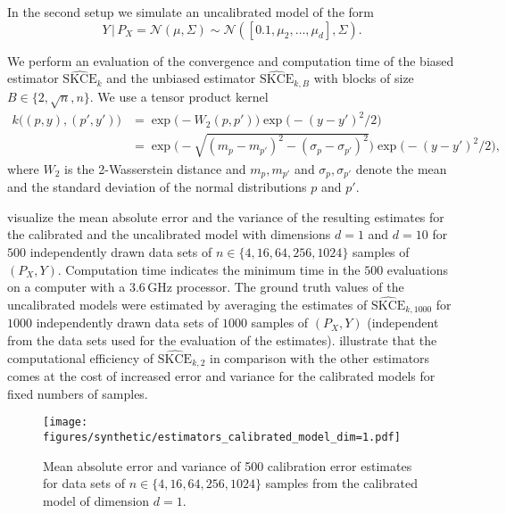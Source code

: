 \documentclass{article}
\begin{document}
In the second setup we simulate an uncalibrated model of the form
\begin{equation*}
    Y \,|\, P_X = \mathcal{N}(\mu, \Sigma) \sim \mathcal{N}([0.1, \mu_2, \ldots, \mu_d], \Sigma).
\end{equation*}

We perform an evaluation of the convergence and computation time of the biased estimator
$\widehat{\mathrm{SKCE}}_k$ and the unbiased estimator $\widehat{\mathrm{SKCE}}_{k,B}$ with
blocks of size $B \in \{2, \sqrt{n}, n\}$. We use a tensor product kernel
\begin{equation*}
\begin{split}
    k\big((p, y), (p', y')\big) &= \exp{\big(- W_2(p, p')\big)} \exp{\big(-(y - y')^2/2\big)} \\
    &= \exp{\bigg(-\sqrt{(m_p - m_{p'})^2 - (\sigma_p - \sigma_{p'})^2}\bigg)} \exp{\big( - (y - y')^2/2\big)},
\end{split}
\end{equation*}
where $W_2$ is the 2-Wasserstein distance and $m_p, m_{p'}$ and $\sigma_p, \sigma_{p'}$
denote the mean and the standard deviation of the normal distributions $p$ and $p'$.

 visualize the mean absolute error and the variance
of the resulting estimates for the calibrated and the uncalibrated model with dimensions
$d = 1$ and $d = 10$ for $500$ independently drawn data sets of $n \in \{4, 16, 64, 256, 1024\}$
samples of $(P_X, Y)$. Computation time indicates the minimum time in the $500$ evaluations
on a computer with a 3.6\,GHz processor. The ground truth values of the uncalibrated models were
estimated by averaging the estimates of $\widehat{\mathrm{SKCE}}_{k,1000}$
for $1000$ independently drawn data sets of $1000$ samples of $(P_X, Y)$ (independent from
the data sets used for the evaluation of the estimates).  illustrate that
the computational efficiency of $\widehat{\mathrm{SKCE}}_{k,2}$ in comparison with the
other estimators comes at the cost of increased error and variance for the calibrated models
for fixed numbers of samples.

\begin{figure}[hpt]
    \begin{center}
        \texttt{[image: figures/synthetic/estimators\_calibrated\_model\_dim=1.pdf]}
        \caption{Mean absolute error and variance of 500 calibration error estimates for
        data sets of $n \in \{4, 16, 64, 256, 1024\}$ samples from the calibrated model
        of dimension $d = 1$.}
        \label{fig:synthetic_estimators_calibrated_1}
    \end{center}
\end{figure}
\end{document}

